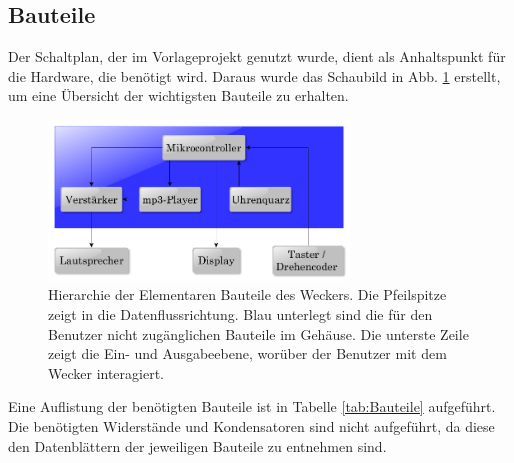 \documentclass[journal, a4paper]{IEEEtran}
\begin{document}
	\subsection{Bauteile}
		\label{sc:Hardware:subsc:Bauteile}
		Der Schaltplan, der im Vorlageprojekt genutzt wurde, dient als Anhaltspunkt für die Hardware, die benötigt wird. Daraus wurde das Schaubild in Abb. \ref{fig:Hierarchie} erstellt, um eine Übersicht der wichtigsten Bauteile zu erhalten.
		\begin{figure}
				\includegraphics[width=80mm]{./Grafiken/Hierarchie}
				\caption{Hierarchie der Elementaren Bauteile des Weckers. Die Pfeilspitze zeigt in die Datenflussrichtung. Blau unterlegt sind die für den Benutzer nicht zugänglichen Bauteile im Gehäuse. Die unterste Zeile zeigt die Ein- und Ausgabeebene, worüber der Benutzer mit dem Wecker interagiert.}
				\label{fig:Hierarchie}
		\end{figure} 
		Eine Auflistung der benötigten Bauteile ist in Tabelle \ref{tab:Bauteile} aufgeführt. Die benötigten Widerstände und Kondensatoren sind nicht aufgeführt, da diese den Datenblättern der jeweiligen Bauteile zu entnehmen sind. 
\end{document}
